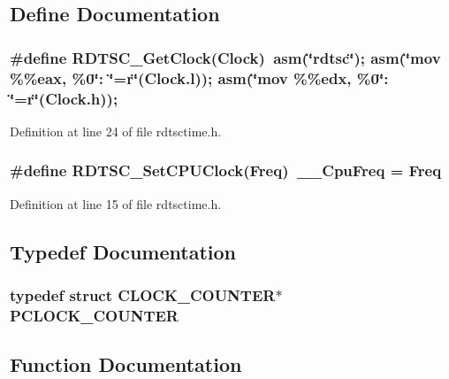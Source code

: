 \subsection{Define Documentation}
\subsubsection[{RDTSC\_\-GetClock}]{\setlength{\rightskip}{0pt plus 5cm}\#define RDTSC\_\-GetClock(Clock)~asm(\char`\"{}rdtsc\char`\"{});	asm(\char`\"{}mov \%\%eax, \%0\char`\"{}: \char`\"{}=r\char`\"{}(Clock.l));	asm(\char`\"{}mov \%\%edx, \%0\char`\"{}: \char`\"{}=r\char`\"{}(Clock.h));}\label{rdtsctime_8h_ac1f68752802c535d9bfd4c1cbe79b825}


Definition at line 24 of file rdtsctime.h.
\subsubsection[{RDTSC\_\-SetCPUClock}]{\setlength{\rightskip}{0pt plus 5cm}\#define RDTSC\_\-SetCPUClock(Freq)~{\bf \_\-\_\-CpuFreq} = Freq}\label{rdtsctime_8h_a68445a898d7f1e6136b69a1e0c8b59c6}


Definition at line 15 of file rdtsctime.h.

\subsection{Typedef Documentation}
\subsubsection[{PCLOCK\_\-COUNTER}]{\setlength{\rightskip}{0pt plus 5cm}typedef  struct {\bf CLOCK\_\-COUNTER}$\ast$ {\bf PCLOCK\_\-COUNTER}}\label{rdtsctime_8h_a266be2c1046a5bf3b61d16fce33600e9}


\subsection{Function Documentation}
